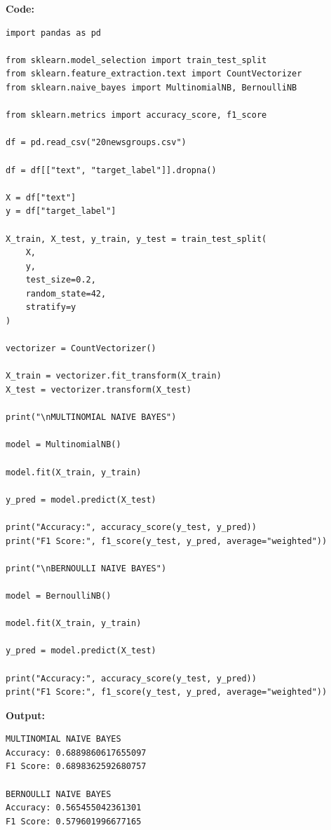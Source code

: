 \documentclass[12pt, a4paper]{article}
\begin{document}
\vspace{\baselineskip}
\noindent \textbf{Code:}\\
\begin{lstlisting}
import pandas as pd

from sklearn.model_selection import train_test_split
from sklearn.feature_extraction.text import CountVectorizer
from sklearn.naive_bayes import MultinomialNB, BernoulliNB

from sklearn.metrics import accuracy_score, f1_score

df = pd.read_csv("20newsgroups.csv")

df = df[["text", "target_label"]].dropna()

X = df["text"]
y = df["target_label"]

X_train, X_test, y_train, y_test = train_test_split(
    X,
    y,
    test_size=0.2,
    random_state=42,
    stratify=y
)

vectorizer = CountVectorizer()

X_train = vectorizer.fit_transform(X_train)
X_test = vectorizer.transform(X_test)

print("\nMULTINOMIAL NAIVE BAYES")

model = MultinomialNB()

model.fit(X_train, y_train)

y_pred = model.predict(X_test)

print("Accuracy:", accuracy_score(y_test, y_pred))
print("F1 Score:", f1_score(y_test, y_pred, average="weighted"))

print("\nBERNOULLI NAIVE BAYES")

model = BernoulliNB()

model.fit(X_train, y_train)

y_pred = model.predict(X_test)

print("Accuracy:", accuracy_score(y_test, y_pred))
print("F1 Score:", f1_score(y_test, y_pred, average="weighted"))
\end{lstlisting}

\vspace{\baselineskip}

\noindent \textbf{Output:}\\
\begin{lstlisting}[style=terminal]
MULTINOMIAL NAIVE BAYES
Accuracy: 0.6889860617655097
F1 Score: 0.6898362592680757

BERNOULLI NAIVE BAYES
Accuracy: 0.565455042361301
F1 Score: 0.579601996677165
\end{lstlisting}
\end{document}
